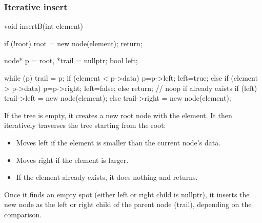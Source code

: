 \documentclass{report}
\begin{document}
\subsubsection{Iterative insert}
\bigbreak \noindent 
\begin{cppcode}
    void insertB(int element) {
        if (!root) {
            root = new node(element);
            return;
        }

        node* p = root, *trail = nullptr;
        bool left;

        while (p) {
            trail = p;
            if (element < p->data) {
                p=p->left;
                left=true;
            } else if (element > p->data) {
                p=p->right;
                left=false;
            } else {
                return; // noop if already exists
            }
        }
        if (left) {
            trail->left = new node(element);
        } else {
            trail->right = new node(element);
        }
    }
\end{cppcode}
\bigbreak \noindent 
If the tree is empty, it creates a new root node with the element.
\bigbreak \noindent 
It then iteratively traverses the tree starting from the root:
\begin{itemize}
    \item Moves left if the element is smaller than the current node's data.
    \item Moves right if the element is larger.
    \item If the element already exists, it does nothing and returns.
\end{itemize}
Once it finds an empty spot (either left or right child is nullptr), it inserts the new node as the left or right child of the parent node (trail), depending on the comparison.

\pagebreak 
\end{document}
